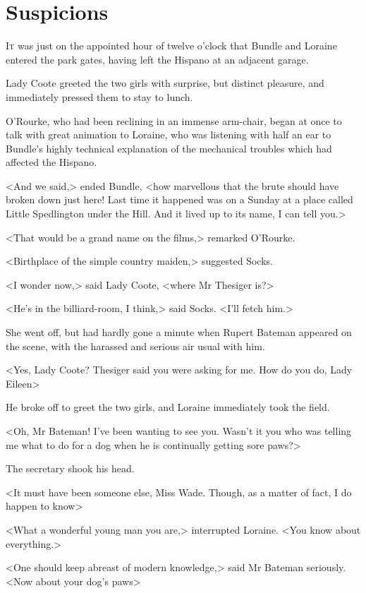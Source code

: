 \chapter{Suspicions}

\lettrine{I}{t} was just on the appointed hour of twelve o'clock that Bundle and Loraine entered the park gates, having left the Hispano at an adjacent garage.

\zz
Lady Coote greeted the two girls with surprise, but distinct pleasure, and immediately pressed them to stay to lunch.

O'Rourke, who had been reclining in an immense arm-chair, began at once to talk with great animation to Loraine, who was listening with half an ear to Bundle's highly technical explanation of the mechanical troubles which had affected the Hispano.

<And we said,> ended Bundle, <how marvellous that the brute should have broken down just here! Last time it happened was on a Sunday at a place called Little Spedlington under the Hill. And it lived up to its name, I can tell you.>

<That would be a grand name on the films,> remarked O'Rourke.

<Birthplace of the simple country maiden,> suggested Socks.

<I wonder now,> said Lady Coote, <where Mr Thesiger is?>

<He's in the billiard-room, I think,> said Socks. <I'll fetch him.>

She went off, but had hardly gone a minute when Rupert Bateman appeared on the scene, with the harassed and serious air usual with him.

<Yes, Lady Coote? Thesiger said you were asking for me. How do you do, Lady Eileen\longdash>

He broke off to greet the two girls, and Loraine immediately took the field.

<Oh, Mr Bateman! I've been wanting to see you. Wasn't it you who was telling me what to do for a dog when he is continually getting sore paws?>

The secretary shook his head.

<It must have been someone else, Miss Wade. Though, as a matter of fact, I do happen to know\longdash>

<What a wonderful young man you are,> interrupted Loraine. <You know about everything.>

<One should keep abreast of modern knowledge,> said Mr Bateman seriously. <Now about your dog's paws\longdash>

